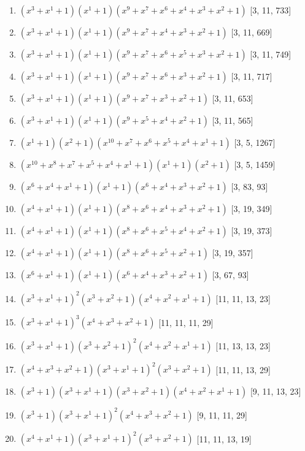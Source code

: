 \documentclass[10pt,twocolumn]{article}
\begin{document}
\begin{enumerate}
\item $(x^{3} + x^{1} + 1)(x^{1} + 1)(x^{9} + x^{7} + x^{6} + x^{4} + x^{3} + x^{2} + 1)$  [3, 11, 733]
\item $(x^{3} + x^{1} + 1)(x^{1} + 1)(x^{9} + x^{7} + x^{4} + x^{3} + x^{2} + 1)$  [3, 11, 669]
\item $(x^{3} + x^{1} + 1)(x^{1} + 1)(x^{9} + x^{7} + x^{6} + x^{5} + x^{3} + x^{2} + 1)$  [3, 11, 749]
\item $(x^{3} + x^{1} + 1)(x^{1} + 1)(x^{9} + x^{7} + x^{6} + x^{3} + x^{2} + 1)$  [3, 11, 717]
\item $(x^{3} + x^{1} + 1)(x^{1} + 1)(x^{9} + x^{7} + x^{3} + x^{2} + 1)$  [3, 11, 653]
\item $(x^{3} + x^{1} + 1)(x^{1} + 1)(x^{9} + x^{5} + x^{4} + x^{2} + 1)$  [3, 11, 565]
\item $(x^{1} + 1)(x^{2} + 1)(x^{10} + x^{7} + x^{6} + x^{5} + x^{4} + x^{1} + 1)$  [3, 5, 1267]
\item $(x^{10} + x^{8} + x^{7} + x^{5} + x^{4} + x^{1} + 1)(x^{1} + 1)(x^{2} + 1)$  [3, 5, 1459]
\item $(x^{6} + x^{4} + x^{1} + 1)(x^{1} + 1)(x^{6} + x^{4} + x^{3} + x^{2} + 1)$  [3, 83, 93]
\item $(x^{4} + x^{1} + 1)(x^{1} + 1)(x^{8} + x^{6} + x^{4} + x^{3} + x^{2} + 1)$  [3, 19, 349]
\item $(x^{4} + x^{1} + 1)(x^{1} + 1)(x^{8} + x^{6} + x^{5} + x^{4} + x^{2} + 1)$  [3, 19, 373]
\item $(x^{4} + x^{1} + 1)(x^{1} + 1)(x^{8} + x^{6} + x^{5} + x^{2} + 1)$  [3, 19, 357]
\item $(x^{6} + x^{1} + 1)(x^{1} + 1)(x^{6} + x^{4} + x^{3} + x^{2} + 1)$  [3, 67, 93]
\item $(x^{3} + x^{1} + 1)^{2}(x^{3} + x^{2} + 1)(x^{4} + x^{2} + x^{1} + 1)$  [11, 11, 13, 23]
\item $(x^{3} + x^{1} + 1)^{3}(x^{4} + x^{3} + x^{2} + 1)$  [11, 11, 11, 29]
\item $(x^{3} + x^{1} + 1)(x^{3} + x^{2} + 1)^{2}(x^{4} + x^{2} + x^{1} + 1)$  [11, 13, 13, 23]
\item $(x^{4} + x^{3} + x^{2} + 1)(x^{3} + x^{1} + 1)^{2}(x^{3} + x^{2} + 1)$  [11, 11, 13, 29]
\item $(x^{3} + 1)(x^{3} + x^{1} + 1)(x^{3} + x^{2} + 1)(x^{4} + x^{2} + x^{1} + 1)$  [9, 11, 13, 23]
\item $(x^{3} + 1)(x^{3} + x^{1} + 1)^{2}(x^{4} + x^{3} + x^{2} + 1)$  [9, 11, 11, 29]
\item $(x^{4} + x^{1} + 1)(x^{3} + x^{1} + 1)^{2}(x^{3} + x^{2} + 1)$  [11, 11, 13, 19]

\end{enumerate}
\end{document}
